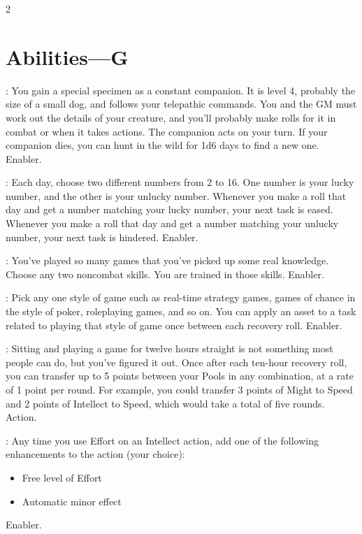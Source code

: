 \begin{multicols}{2}

\section{Abilities—G}

: You gain a special specimen as a constant companion. It is level 4, probably the size of a small dog, and follows your telepathic commands. You and the GM must work out the details of your creature, and you’ll probably make rolls for it in combat or when it takes actions. The companion acts on your turn. If your companion dies, you can hunt in the wild for 1d6 days to find a new one. Enabler. 
 
: Each day, choose two different numbers from 2 to 16. One number is your lucky number, and the other is your unlucky number. Whenever you make a roll that day and get a number matching your lucky number, your next task is eased. Whenever you make a roll that day and get a number matching your unlucky number, your next task is hindered. Enabler. 
 
: You’ve played so many games that you’ve picked up some real knowledge. Choose any two noncombat skills. You are trained in those skills. Enabler. 
 
: Pick any one style of game such as real-time strategy games, games of chance in the style of poker, roleplaying games, and so on. You can apply an asset to a task related to playing that style of game once between each recovery roll. Enabler. 
 
: Sitting and playing a game for twelve hours straight is not something most people can do, but you’ve figured it out. Once after each ten-hour recovery roll, you can transfer up to 5 points between your Pools in any combination, at a rate of 1 point per round. For example, you could transfer 3 points of Might to Speed and 2 points of Intellect to Speed, which would take a total of five rounds. Action. 
 
: Any time you use Effort on an Intellect action, add one of the following enhancements to the action (your choice): 

\begin{itemize} 
\item Free level of Effort 
\item Automatic minor effect
\end{itemize}
Enabler.
 

\end{multicols}

